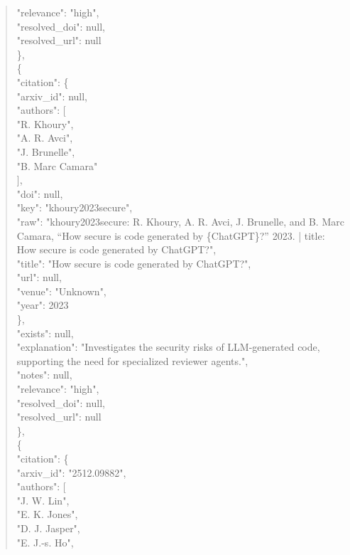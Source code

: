 \documentclass[11pt]{article}
\begin{document}
\begin{quote}
      "relevance": "high",\\
      "resolved\_doi": null,\\
      "resolved\_url": null\\
    \},\\
    \{\\
      "citation": \{\\
        "arxiv\_id": null,\\
        "authors": [\\
          "R. Khoury",\\
          "A. R. Avci",\\
          "J. Brunelle",\\
          "B. Marc Camara"\\
        ],\\
        "doi": null,\\
        "key": "khoury2023secure",\\
        "raw": "khoury2023secure: R. Khoury, A. R. Avci, J. Brunelle, and B. Marc Camara, ``How secure is code generated by \{ChatGPT\}?'' 2023. | title: How secure is code generated by ChatGPT?",\\
        "title": "How secure is code generated by ChatGPT?",\\
        "url": null,\\
        "venue": "Unknown",\\
        "year": 2023\\
      \},\\
      "exists": null,\\
      "explanation": "Investigates the security risks of LLM-generated code, supporting the need for specialized reviewer agents.",\\
      "notes": null,\\
      "relevance": "high",\\
      "resolved\_doi": null,\\
      "resolved\_url": null\\
    \},\\
    \{\\
      "citation": \{\\
        "arxiv\_id": "2512.09882",\\
        "authors": [\\
          "J. W. Lin",\\
          "E. K. Jones",\\
          "D. J. Jasper",\\
          "E. J.-s. Ho",\\

\end{quote}
\end{document}
